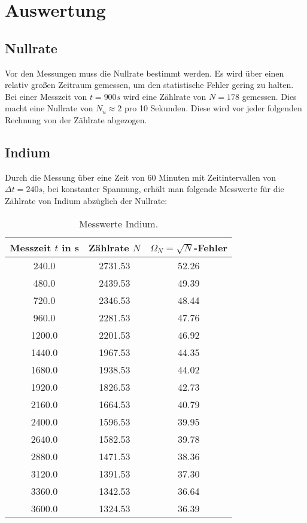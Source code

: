 \section{Auswertung}
\label{sec:Auswertung}

\subsection{Nullrate}
\label{sec:null}
Vor den Messungen muss die Nullrate bestimmt werden.
Es wird über einen relativ großen Zeitraum gemessen, um den statistische Fehler gering zu halten.
Bei einer Messzeit von $t = 900s$ wird eine Zählrate von $N = 178$ gemessen.
Dies macht eine Nullrate von $N_u \approx 2$ pro 10 Sekunden.
Diese wird vor jeder folgenden Rechnung von der Zählrate abgezogen.

\subsection{Indium}
\label{sec:indium}

Durch die Messung über eine Zeit von 60 Minuten mit Zeitintervallen von $\Delta t = 240s$, bei konstanter Spannung, erhält man folgende Messwerte für die Zählrate von Indium abzüglich der Nullrate:

\begin{table}
  \centering
  \caption{Messwerte Indium.}
  \label{tab:N1}
\begin{tabular}{c c c}
  \toprule
  Messzeit $t$ in s & Zählrate $N$ & $\Omega_N = \sqrt{N}$-Fehler\\
  \midrule
  240.0 & 2731.53 & 52.26  \\
  480.0 & 2439.53 & 49.39  \\
  720.0 & 2346.53 & 48.44  \\
  960.0 & 2281.53 & 47.76  \\
  1200.0 & 2201.53 & 46.92  \\
  1440.0 & 1967.53 & 44.35  \\
  1680.0 & 1938.53 & 44.02  \\
  1920.0 & 1826.53 & 42.73  \\
  2160.0 & 1664.53 & 40.79  \\
  2400.0 & 1596.53 & 39.95  \\
  2640.0 & 1582.53 & 39.78  \\
  2880.0 & 1471.53 & 38.36  \\
  3120.0 & 1391.53 & 37.30  \\
  3360.0 & 1342.53 & 36.64  \\
  3600.0 & 1324.53 & 36.39  \\
  \bottomrule
\end{tabular}
\end{table}
\FloatBarrier

